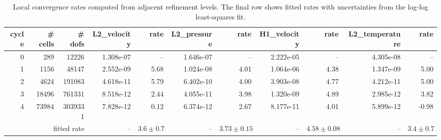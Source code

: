\begin{table}[htbp]
\centering
\begin{tabular}{|r|r|r|r|r|r|r|r|r|r|r|}
\hline
cycle & \# cells & \# dofs & L2\_velocity & rate & L2\_pressure & rate & H1\_velocity & rate & L2\_temperature & rate \\ \hline
0 & 289 & 12226 & 1.308e-07 & -- & 1.646e-07 & -- & 2.222e-05 & -- & 4.305e-08 & -- \\ \hline
1 & 1156 & 48147 & 2.552e-09 & 5.68 & 1.024e-08 & 4.01 & 1.064e-06 & 4.38 & 1.347e-09 & 5.00 \\ \hline
2 & 4624 & 191083 & 4.618e-11 & 5.79 & 6.402e-10 & 4.00 & 3.903e-08 & 4.77 & 4.212e-11 & 5.00 \\ \hline
3 & 18496 & 761331 & 8.518e-12 & 2.44 & 4.055e-11 & 3.98 & 1.320e-09 & 4.89 & 2.985e-12 & 3.82 \\ \hline
4 & 73984 & 3039331 & 7.828e-12 & 0.12 & 6.374e-12 & 2.67 & 8.177e-11 & 4.01 & 5.899e-12 & -0.98 \\ \hline
\multicolumn{3}{|r|}{fitted rate} & -- & $3.6 \pm 0.7$ & -- & $3.73 \pm 0.15$ & -- & $4.58 \pm 0.08$ & -- & $3.4 \pm 0.7$ \\ \hline
\end{tabular}
\caption{Local convergence rates computed from adjacent refinement levels. The final row shows fitted rates with uncertainties from the log-log least-squares fit.}
\end{table}
